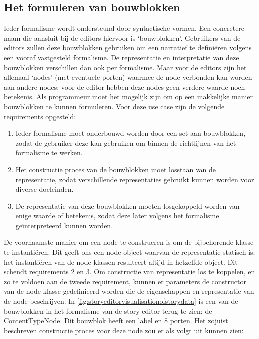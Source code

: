 \subsection{Het formuleren van bouwblokken}
Ieder formalisme wordt ondersteund door syntactische vormen. Een concretere naam die aansluit bij de editors hiervoor is ‘bouwblokken’. Gebruikers van de editors zullen deze bouwblokken gebruiken om een narratief te definiëren volgens een vooraf vastgesteld formalisme. De representatie en interpretatie van deze bouwblokken verschillen dan ook per formalisme. Maar voor de editors zijn het allemaal ‘nodes’ (met eventuele porten) waarmee de node verbonden kan worden aan andere nodes; voor de editor hebben deze nodes geen verdere waarde noch betekenis. Als programmeur moet het mogelijk zijn om op een makkelijke manier bouwblokken te kunnen formuleren. Voor deze use case zijn de volgende requirements opgesteld:

\begin{enumerate}
    \item Ieder formalisme moet onderbouwd worden door een set aan bouwblokken, zodat de gebruiker deze kan gebruiken om binnen de richtlijnen van het formalisme te werken.
    \item Het constructie proces van de bouwblokken moet losstaan van de representatie, zodat verschillende representaties gebruikt kunnen worden voor diverse doeleinden.
    \item De representatie van deze bouwblokken moeten losgekoppeld worden van enige waarde of betekenis, zodat deze later volgens het formalisme geïnterpreteerd kunnen worden.
\end{enumerate}

De voornaamste manier om een node te construeren is om de bijbehorende klasse te instantiëren. Dit geeft ons een node object waarvan de representatie statisch is; het instantiëren van de node klassen resulteert altijd in hetzelfde object. Dit schendt requirements 2 en 3. Om constructie van representatie los te koppelen, en zo te voldoen aan de tweede requirement, kunnen er parameters de constructor van de node klasse gedefinieerd worden die de eigenschappen en representatie van de node beschrijven. In \autoref{fig:storyeditorvisualisationofstorydata} is een van de bouwblokken in het formalisme van de story editor terug te zien: de ContentTypeNode. Dit bouwblok heeft een label en 8 porten. Het zojuist beschreven constructie proces voor deze node zou er als volgt uit kunnen zien:\\


\noindent{}